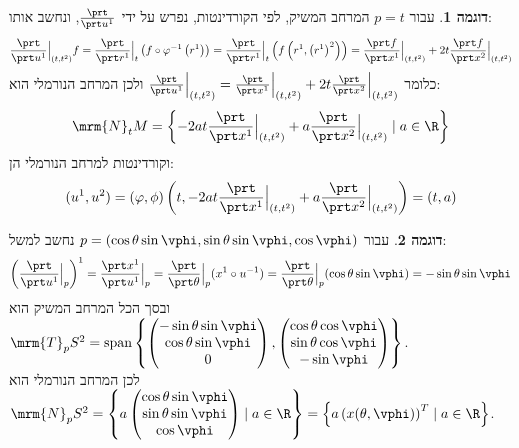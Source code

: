 \documentclass{article}
\theoremstyle{definition}
\newtheorem*{example*}{דוגמה}
\DeclareMathOperator{\spn}{span}
\begin{document}
	\begin{example*}
		עבור
		\(p=t\)
		המרחב המשיק, לפי הקורדינטות, נפרש על ידי
		\(\frac{\prt}{\prt u^1}\),
		ונחשב אותו:
		\[
			\frac{\prt}{\prt u^1}\Big|_{(t,t^2)} f
			=\frac{\prt}{\prt r^1}\Big|_t\left(f\circ\varphi^{-1}\left(r^1\right)\right)
			=\frac{\prt}{\prt r^1}\Big|_t\left(f\left(r^1,\left(r^1\right)^2\right)\right)
			=\frac{\prt f}{\prt x^1}\Big|_{(t,t^2)}+2t\frac{\prt f}{\prt x^2}\Big|_{(t,t^2)}
		\]
		כלומר
		\(
			\frac{\prt}{\prt u^1}\Big|_{(t,t^2)}
			=\frac{\prt}{\prt x^1}\Big|_{(t,t^2)}+2t\frac{\prt}{\prt x^2}\Big|_{(t,t^2)}
		\)
		ולכן המרחב הנורמלי הוא:
		\[
			\mrm{N}_t M
			= \left\{
				-2at\frac{\prt}{\prt x^1}\Big|_{(t,t^2)}+a\frac{\prt}{\prt x^2}\Big|_{(t,t^2)}
				\mid
				a \in \R
			\right\}
		\]
		וקורדינטות למרחב הנורמלי הן:
		\[
			(u^1,u^2)
			=\left(\varphi,\phi\right)\left(t,-2at\frac{\prt}{\prt x^1}\Big|_{(t,t^2)}+a\frac{\prt}{\prt x^2}\Big|_{(t,t^2)}\right)
			=(t,a)
		\]
	\end{example*}

	\begin{example*}
		עבור
		\(p=(\cos\theta \sin\vphi, \sin\theta \sin\vphi, \cos\vphi)\)
		נחשב למשל:
		\[
			\left(\frac{\prt}{\prt u^1}\Big|_p\right)^1
			= \frac{\prt x^1}{\prt u^1}\Big|_p
			= \frac{\prt}{\prt \theta}\Big|_p (x^1 \circ u^{-1})
			= \frac{\prt}{\prt \theta}\Big|_p (\cos\theta \sin\vphi)
			= -\sin\theta \sin\vphi
		\]
		ובסך הכל המרחב המשיק הוא
		\(
			\mrm{T}_p S^2
			= \spn\left\{
				\begin{pmatrix}
					-\sin\theta \sin\vphi \\ \cos\theta \sin\vphi \\ 0
				\end{pmatrix},
				\begin{pmatrix}
					\cos\theta \cos\vphi \\ \sin\theta \cos\vphi \\ -\sin\vphi
				\end{pmatrix}
			\right\}
		\).
		\\
		לכן המרחב הנורמלי הוא
		\(
			\mrm{N}_p S^2
			= \left\{
				a
				\begin{pmatrix}
					\cos\theta \sin\vphi \\ \sin\theta \sin\vphi \\ \cos\vphi
				\end{pmatrix}
				\mid
				a \in \R
			\right\}
			= \left\{
				a
				\left(x(\theta, \vphi)\right)^T
				\mid
				a \in \R
			\right\}
		\).
	\end{example*}
\end{document}
